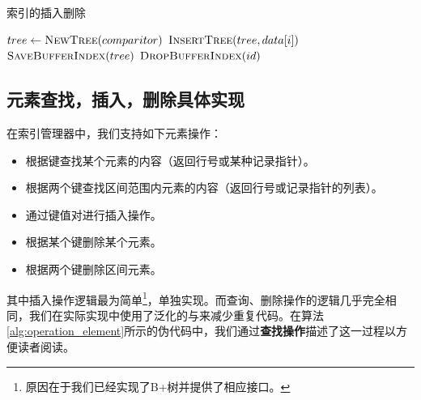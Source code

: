 \documentclass[UTF8]{ctexrep} %
\begin{document}
\begin{algorithm}
    \caption{索引的插入删除}
    \label{alg:index_creation_deletion}
    \begin{algorithmic}
            \State $tree \leftarrow \Call{NewTree}{comparitor}$
                \State $\Call{InsertTree}{tree, data[i]}$
            \EndFor
            \State $\Call{SaveBufferIndex}{tree}$
        \EndFunction
            \State $\Call{DropBufferIndex}{id}$
        \EndFunction
    \end{algorithmic}
\end{algorithm}

\subsection{元素查找，插入，删除具体实现}
在索引管理器中，我们支持如下元素操作：
\begin{itemize}
    \item 根据键查找某个元素的内容（返回行号或某种记录指针）。
    \item 根据两个键查找区间范围内元素的内容（返回行号或记录指针的列表）。
    \item 通过键值对进行插入操作。
    \item 根据某个键删除某个元素。
    \item 根据两个键删除区间元素。
\end{itemize}
其中插入操作逻辑最为简单\footnote{原因在于我们已经实现了B+树并提供了相应接口。}，单独实现。而查询、删除操作的逻辑几乎完全相同，我们在实际实现中使用了泛化的与来减少重复代码。在算法\ref{alg:operation_element}所示的伪代码中，我们通过\textbf{查找操作}描述了这一过程以方便读者阅读。
\end{document}
